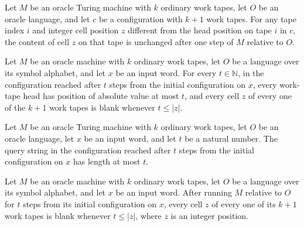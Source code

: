\begin{lemma}
\label{Turing.OracleTM.workTapes_step_eq_of_ne}
\leanok
{}
Let $M$ be an oracle Turing machine with $k$ ordinary work tapes, let $O$ be an oracle
language, and let $c$ be a configuration with $k+1$ work tapes. For any tape index $i$
and integer cell position $z$ different from the head position on tape $i$ in $c$, the
content of cell $z$ on that tape is unchanged after one step of $M$ relative to $O$.
\end{lemma}

\begin{lemma}
\label{Turing.OracleTM.runFrom_workTapes_invariant}
\leanok
{}
Let $M$ be an oracle machine with $k$ ordinary work tapes, let $O$ be a language over
its symbol alphabet, and let $x$ be an input word. For every $t\in\mathbb{N}$, in the
configuration reached after $t$ steps from the initial configuration on $x$, every
work-tape head has position of absolute value at most $t$, and every cell $z$ of every
one of the $k+1$ work tapes is blank whenever $t\le |z|$.
\end{lemma}

\begin{theorem}
\label{Turing.OracleTM.queryString_length_le}
\leanok
{}
Let $M$ be an oracle Turing machine with $k$ ordinary work tapes, let $O$ be an oracle
language, let $x$ be an input word, and let $t$ be a natural number. The query string in
the configuration reached after $t$ steps from the initial configuration on $x$ has
length at most $t$.
\end{theorem}

\begin{theorem}
\label{Turing.OracleTM.runFrom_workTapes_blank}
\leanok
{}
Let $M$ be an oracle machine with $k$ ordinary work tapes, let $O$ be a language over
its symbol alphabet, and let $x$ be an input word. After running $M$ relative to $O$ for
$t$ steps from its initial configuration on $x$, every cell $z$ of every one of its
$k+1$ work tapes is blank whenever $t\le |z|$, where $z$ is an integer position.
\end{theorem}

